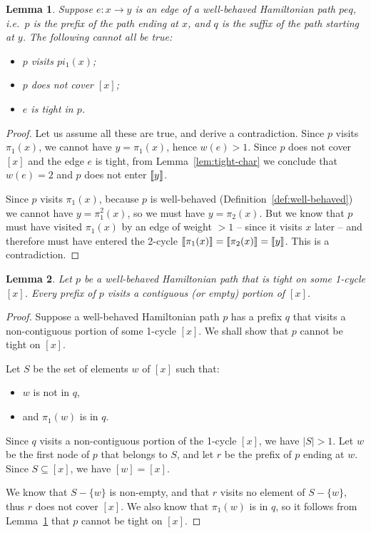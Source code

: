 \documentclass[a4paper]{article}
\newtheorem{lemma}{Lemma}
\theoremstyle{definition}
\theoremstyle{remark}
\begin{document}
\begin{lemma}\label{lem:tight-contra}
Suppose $e: x\to y$ is an edge of a well-behaved Hamiltonian path $peq$, i.e.\ $p$ is the prefix of the path ending at $x$, and $q$ is the suffix of the path starting at $y$. The following cannot all be true:
\begin{itemize}
    \item $p$ visits $pi_1(x)$;
    \item $p$ does not cover $[x]$;
    \item $e$ is tight in $p$.
\end{itemize}
\end{lemma}
\begin{proof}
    Let us assume all these are true, and derive a contradiction. Since $p$ visits $\pi_1(x)$, we cannot have $y = \pi_1(x)$, hence $w(e) > 1$. Since $p$ does not cover $[x]$ and the edge $e$ is tight, from Lemma~\ref{lem:tight-char} we conclude that $w(e) = 2$ and $p$ does not enter $\llbracket y\rrbracket$.

    Since $p$ visits $\pi_1(x)$, because $p$ is well-behaved (Definition~\ref{def:well-behaved}) we cannot have $y = \pi_1^2(x)$, so we must have $y = \pi_2(x)$. But we know that $p$ must have visited $\pi_1(x)$ by an edge of weight ${} > 1$ -- since it visits $x$ later -- and therefore must have entered the 2-cycle $\llbracket\pi_1(x)\rrbracket = \llbracket\pi_2(x)\rrbracket = \llbracket y\rrbracket$. This is a contradiction.
\end{proof}

\begin{lemma}\label{lem:contig}
    Let $p$ be a well-behaved Hamiltonian path that is tight on some 1-cycle $[x]$. Every prefix of $p$ visits a contiguous (or empty) portion of $[x]$.
\end{lemma}
\begin{proof}
    Suppose a well-behaved Hamiltonian path $p$ has a prefix $q$ that visits a non-contiguous portion of some 1-cycle $[x]$. We shall show that $p$ cannot be tight on $[x]$.

    Let $S$ be the set of elements $w$ of $[x]$ such that:
    \begin{itemize}
        \item $w$ is not in $q$,
        \item and $\pi_1(w)$ is in $q$.
    \end{itemize}

    Since $q$ visits a non-contiguous portion of the 1-cycle $[x]$, we have $|S| > 1$. Let $w$ be the first node of $p$ that belongs to $S$, and let $r$ be the prefix of $p$ ending at $w$. Since $S\subseteq[x]$, we have $[w]=[x]$.

    We know that $S-\{w\}$ is non-empty, and that $r$ visits no element of $S-\{w\}$, thus $r$ does not cover $[x]$. We also know that $\pi_1(w)$ is in $q$, so it follows from Lemma~\ref{lem:tight-contra} that $p$ cannot be tight on $[x]$.
\end{proof}
\end{document}
